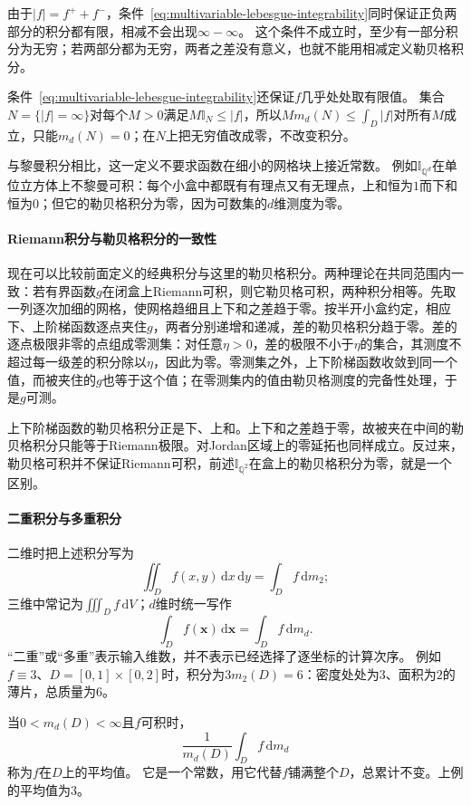 由于$|f|=f^++f^-$，条件~\eqref{eq:multivariable-lebesgue-integrability}同时保证正负两部分的积分都有限，相减不会出现$\infty-\infty$。
这个条件不成立时，至少有一部分积分为无穷；若两部分都为无穷，两者之差没有意义，也就不能用相减定义勒贝格积分。

条件~\eqref{eq:multivariable-lebesgue-integrability}还保证$f$几乎处处取有限值。
集合$N=\{|f|=\infty\}$对每个$M>0$满足$M\mathbb I_N\leq|f|$，所以$Mm_d(N)\leq\int_D|f|$对所有$M$成立，只能$m_d(N)=0$；在$N$上把无穷值改成零，不改变积分。

与黎曼积分相比，这一定义不要求函数在细小的网格块上接近常数。
例如$\mathbb I_{\mathbb Q^d}$在单位立方体上不黎曼可积：每个小盒中都既有有理点又有无理点，上和恒为$1$而下和恒为$0$；但它的勒贝格积分为零，因为可数集的$d$维测度为零。

\paragraph{Riemann积分与勒贝格积分的一致性}
现在可以比较前面定义的经典积分与这里的勒贝格积分。两种理论在共同范围内一致：若有界函数$g$在闭盒上Riemann可积，则它勒贝格可积，两种积分相等。先取一列逐次加细的网格，使网格趋细且上下和之差趋于零。按半开小盒约定，相应下、上阶梯函数逐点夹住$g$，两者分别递增和递减，差的勒贝格积分趋于零。差的逐点极限非零的点组成零测集：对任意$\eta>0$，差的极限不小于$\eta$的集合，其测度不超过每一级差的积分除以$\eta$，因此为零。零测集之外，上下阶梯函数收敛到同一个值，而被夹住的$g$也等于这个值；在零测集内的值由勒贝格测度的完备性处理，于是$g$可测。

上下阶梯函数的勒贝格积分正是下、上和。上下和之差趋于零，故被夹在中间的勒贝格积分只能等于Riemann极限。对Jordan区域上的零延拓也同样成立。反过来，勒贝格可积并不保证Riemann可积，前述$\mathbb I_{\mathbb Q^2}$在盒上的勒贝格积分为零，就是一个区别。

\paragraph{二重积分与多重积分}

二维时把上述积分写为
\[
 \iint_Df(x,y)\,\mathrm dx\,\mathrm dy=\int_Df\,\mathrm dm_2;
\]
三维中常记为$\iiint_Df\,\mathrm dV$；$d$维时统一写作
\[
 \int_Df(\bm x)\,\mathrm d\bm x=\int_Df\,\mathrm dm_d.
\]
“二重”或“多重”表示输入维数，并不表示已经选择了逐坐标的计算次序。
例如$f\equiv3$、$D=[0,1]\times[0,2]$时，积分为$3m_2(D)=6$：密度处处为$3$、面积为$2$的薄片，总质量为$6$。

当$0<m_d(D)<\infty$且$f$可积时，
\[
 \frac{1}{m_d(D)}\int_Df\,\mathrm dm_d
\]
称为$f$在$D$上的平均值。
它是一个常数，用它代替$f$铺满整个$D$，总累计不变。上例的平均值为$3$。

